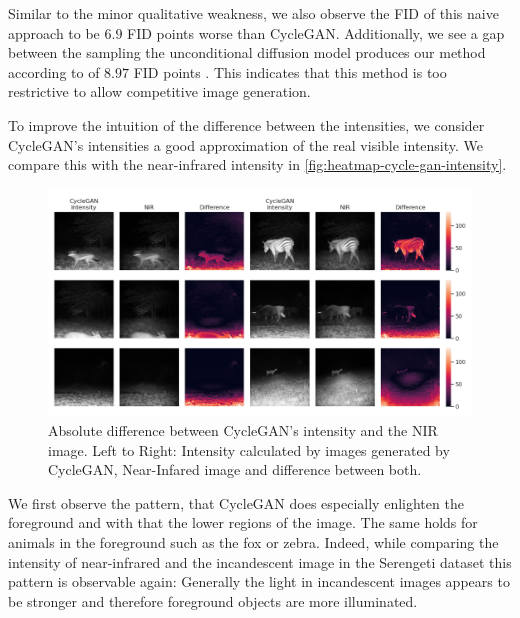 Similar to the minor qualitative weakness, we also observe the FID of this naive approach to be $6.9$ FID points worse than CycleGAN.
Additionally, we see a gap between the sampling the unconditional diffusion model produces our method according to  of $8.97$ FID points \parencite{sbgm}.
This indicates that this method is too restrictive to allow competitive image generation.



To improve the intuition of the difference between the intensities, we consider CycleGAN's intensities a good approximation of the real visible intensity.
We compare this with the near-infrared intensity in \autoref{fig:heatmap-cycle-gan-intensity}.

\begin{figure}[htp!]
    \centering
    \includegraphics[width=\textwidth]{gfx/heatmap-nir-cycle-gan-intensity-diff.png}
    \caption{
        Absolute difference between CycleGAN's intensity and the NIR image.
        Left to Right: Intensity calculated by images generated by CycleGAN, Near-Infared image \parencite{serengeti} and difference between both.
    }
    \label{fig:heatmap-cycle-gan-intensity}
\end{figure}

We first observe the pattern, that CycleGAN does especially enlighten the foreground and with that the lower regions of the image.
The same holds for animals in the foreground such as the fox or zebra.
Indeed, while comparing the intensity of near-infrared and the incandescent image in the Serengeti dataset \parencite{serengeti}
this pattern is observable again:
Generally the light in incandescent images appears to be stronger and therefore foreground objects are more illuminated.

